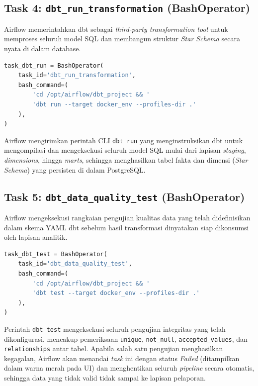 \subsection*{Task 4: \texttt{dbt\_run\_transformation} (BashOperator)}

Airflow memerintahkan dbt sebagai \textit{third-party transformation tool} untuk memproses
seluruh model SQL dan membangun struktur \textit{Star Schema} secara nyata di dalam database.

\begin{lstlisting}[language=Python, caption=Definisi Task dbt\_run\_transformation]
task_dbt_run = BashOperator(
    task_id='dbt_run_transformation',
    bash_command=(
        'cd /opt/airflow/dbt_project && '
        'dbt run --target docker_env --profiles-dir .'
    ),
)
\end{lstlisting}

Airflow mengirimkan perintah CLI \texttt{dbt run} yang menginstruksikan dbt untuk
mengompilasi dan mengeksekusi seluruh model SQL mulai dari lapisan \textit{staging},
\textit{dimensions}, hingga \textit{marts}, sehingga menghasilkan tabel fakta dan dimensi
(\textit{Star Schema}) yang persisten di dalam PostgreSQL.

\subsection*{Task 5: \texttt{dbt\_data\_quality\_test} (BashOperator)}

Airflow mengeksekusi rangkaian pengujian kualitas data yang telah didefinisikan dalam skema
YAML dbt sebelum hasil transformasi dinyatakan siap dikonsumsi oleh lapisan analitik.

\begin{lstlisting}[language=Python, caption=Definisi Task dbt\_data\_quality\_test]
task_dbt_test = BashOperator(
    task_id='dbt_data_quality_test',
    bash_command=(
        'cd /opt/airflow/dbt_project && '
        'dbt test --target docker_env --profiles-dir .'
    ),
)
\end{lstlisting}

Perintah \texttt{dbt test} mengeksekusi seluruh pengujian integritas yang telah
dikonfigurasi, mencakup pemeriksaan \texttt{unique}, \texttt{not\_null},
\texttt{accepted\_values}, dan \texttt{relationships} antar tabel. Apabila salah satu
pengujian menghasilkan kegagalan, Airflow akan menandai \textit{task} ini dengan status
\textit{Failed} (ditampilkan dalam warna merah pada UI) dan menghentikan seluruh
\textit{pipeline} secara otomatis, sehingga data yang tidak valid tidak sampai ke lapisan
pelaporan.

